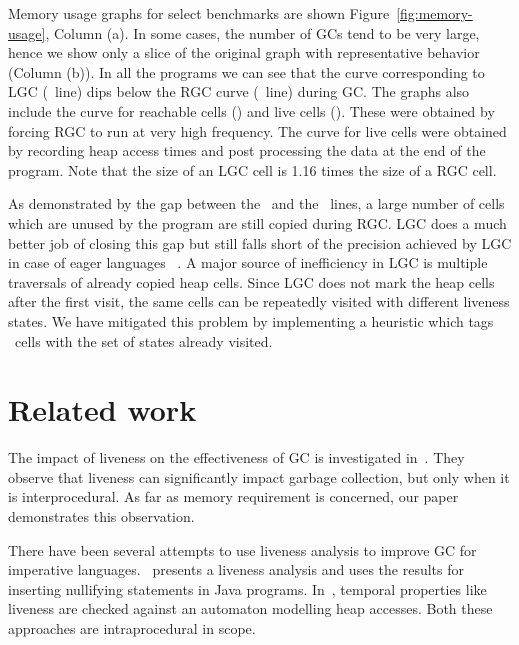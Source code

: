\documentclass[9pt]{sigplanconf}
\begin{document}
Memory  usage graphs  for select  benchmarks are  shown
Figure~\ref{fig:memory-usage},  Column   (a).   In some cases, the
number of  GCs  tend to be  very large,
hence  we  show only  a  slice of the original graph  with 
representative    behavior  (Column (b)).  In all the programs we can see
that  the   curve  corresponding  to  LGC   (\LGCLine\ line)
dips   below the RGC curve 
(\RGCLine\ line) during GC.  The graphs also include the
curve    for   reachable    cells   (\ReachLine)  and live cells
(\UseLine). These were  obtained
 by forcing  RGC to  run at   very  high
frequency. The curve for live cells were obtained by recording heap
access times and post processing the data 
at the end of the program. Note that the size of an LGC cell is 1.16
times the size of a RGC cell.


As  demonstrated by  the gap  between the  \RGCLine\ and  the \UseLine\
lines, a  large number of  cells which are  unused by the  program are
still copied  during RGC. LGC does  a much better job  of closing this
gap but still falls short of the  precision achieved by LGC in case of
eager languages ~\cite{asati14lgc}.  A major source of inefficiency in
LGC is  multiple traversals  of already copied  heap cells.  Since LGC
does not mark the heap cells after the first visit, the same cells can
be  repeatedly  visited  with   different  liveness  states.  We  have
mitigated  this  problem  by   implementing  a  heuristic  which  tags
\CONS\ cells with the set of states already visited.


\vspace*{-2mm}
\section{Related work} 
\label{sec:relatedwork}
The impact of  liveness on the effectiveness of  GC is
investigated in~\cite{Hirzel}.   They observe that  liveness can
significantly  impact   garbage  collection,  but  only   when  it  is
interprocedural.  As far as memory requirement is concerned, our paper
demonstrates this observation.

There have been several attempts to use liveness analysis to improve 
GC for imperative languages.~\cite{khedker07heap}
presents a liveness analysis and uses the results for inserting 
nullifying statements in Java programs. In~\cite{ran.shaham-sas03},
temporal properties like liveness are checked  against an automaton modelling heap accesses.
Both these approaches are intraprocedural in scope.
\end{document}
